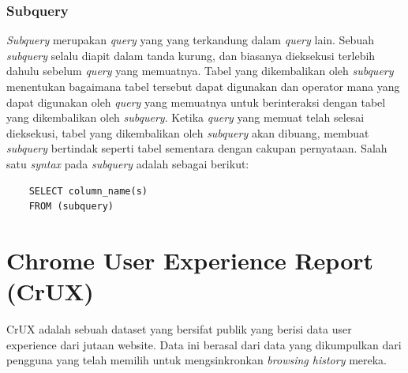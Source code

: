 \subsubsection{Subquery}
\textit{Subquery} merupakan \textit{query} yang yang terkandung dalam \textit{query} lain. Sebuah \textit{subquery} selalu diapit dalam tanda kurung, dan biasanya dieksekusi terlebih dahulu sebelum \textit{query} yang memuatnya. Tabel yang dikembalikan oleh \textit{subquery} menentukan bagaimana tabel tersebut dapat digunakan dan operator mana yang dapat digunakan oleh \textit{query} yang memuatnya untuk berinteraksi dengan tabel yang dikembalikan oleh \textit{subquery}. Ketika \textit{query} yang memuat telah selesai dieksekusi, tabel yang dikembalikan oleh \textit{subquery} akan dibuang, membuat \textit{subquery} bertindak seperti tabel sementara dengan cakupan pernyataan. Salah satu \textit{syntax} pada \textit{subquery} adalah sebagai berikut:
\begin{verbatim}
    SELECT column_name(s)
    FROM (subquery)
\end{verbatim}

\section{Chrome User Experience Report (CrUX)}
CrUX adalah sebuah dataset yang bersifat publik yang berisi data user experience dari jutaan website. Data ini berasal dari data yang dikumpulkan dari pengguna yang telah memilih untuk mengsinkronkan \textit{browsing history} mereka.  

